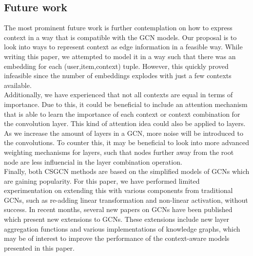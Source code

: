\subsection{Future work}
The most prominent future work is further contemplation on how to express context in a way that is compatible with the GCN models.
Our proposal is to look into ways to represent context as edge information in a feasible way.
While writing this paper, we attempted to model it in a way such that there was an embedding for each (user,item,context) tuple.
However, this quickly proved infeasible since the number of embeddings explodes with just a few contexts available.
\\
Additionally, we have experienced that not all contexts are equal in terms of importance.
Due to this, it could be beneficial to include an attention mechanism that is able to learn the importance of each context or context combination for the convolution layer.
This kind of attention idea could also be applied to layers.
As we increase the amount of layers in a GCN, more noise will be introduced to the convolutions.
To counter this, it may be beneficial to look into more advanced weighting mechanisms for layers, such that nodes further away from the root node are less influencial in the layer combination operation.
\\
Finally, both CSGCN methods are based on the simplified models of GCNs which are gaining popularity.
For this paper, we have performed limited experimentation on extending this with various components from traditional GCNs, such as re-adding linear transformation and non-linear activation, without success.
In recent months, several new papers on GCNs have been published which present new extensions to GCNs.
These extensions include new layer aggregation functions and various implementations of knowledge graphs, which may be of interest to improve the performance of the context-aware models presented in this paper.
